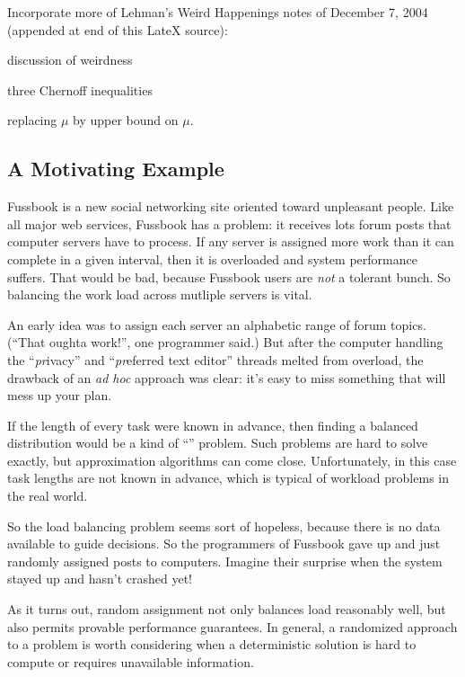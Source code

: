 \begin{editingnotes}
Incorporate more of Lehman's Weird Happenings notes of December 7,
2004 (appended at end of this LateX source):

discussion of weirdness

three Chernoff inequalities

replacing $\mu$ by upper bound on $\mu$.

\end{editingnotes}


\subsection{A Motivating Example}

Fussbook is a new social networking site oriented toward unpleasant
people.  Like all major web services, Fussbook has a  problem: it receives lots forum posts that computer
servers have to process.  If any server is assigned more work than it
can complete in a given interval, then it is overloaded and system
performance suffers.  That would be bad, because Fussbook users are
\emph{not} a tolerant bunch.  So balancing the work load across
mutliple servers is vital.

An early idea was to assign each server an alphabetic range of forum
topics.  (``That oughta work!'', one programmer said.)  But after the
computer handling the ``\emph{pr}ivacy'' and ``\emph{pr}eferred text
editor'' threads melted from overload, the drawback of an \emph{ad
  hoc} approach was clear: it's easy to miss something that will mess
up your plan.

If the length of every task were known in advance, then finding a
balanced distribution would be a kind of ``''
problem.  Such problems are hard to solve exactly, but approximation
algorithms can come close.  Unfortunately, in this case task lengths
are not known in advance, which is typical of workload problems in the
real world.

So the load balancing problem seems sort of hopeless, because there is
no data available to guide decisions.  So the programmers of Fussbook
gave up and just randomly assigned posts to computers.  Imagine their
surprise when the system stayed up and hasn't crashed yet!

As it turns out, random assignment not only balances load reasonably
well, but also permits provable performance guarantees.  In general,
a randomized approach to a problem is worth considering when a
deterministic solution is hard to compute or requires unavailable
information.

